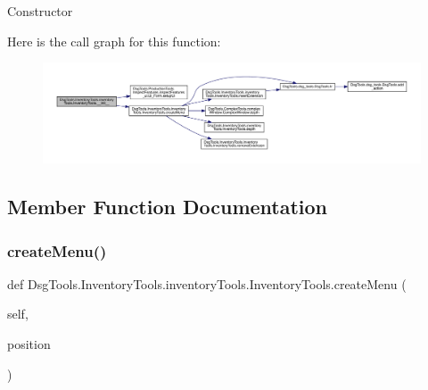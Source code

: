 \begin{DoxyVerb}Constructor
\end{DoxyVerb}
 Here is the call graph for this function\+:
\nopagebreak
\begin{figure}[H]
\begin{center}
\leavevmode
\includegraphics[width=350pt]{class_dsg_tools_1_1_inventory_tools_1_1inventory_tools_1_1_inventory_tools_ac27f158d879dd73dc7f4564d6e419e68_cgraph}
\end{center}
\end{figure}


\subsection{Member Function Documentation}
\mbox{\label{class_dsg_tools_1_1_inventory_tools_1_1inventory_tools_1_1_inventory_tools_ad2eacea7f239cce9518b8096a51cd9ed}} 
\subsubsection{\texorpdfstring{create\+Menu()}{createMenu()}}
{\footnotesize\ttfamily def Dsg\+Tools.\+Inventory\+Tools.\+inventory\+Tools.\+Inventory\+Tools.\+create\+Menu (\begin{DoxyParamCaption}\item[{}]{self,  }\item[{}]{position }\end{DoxyParamCaption})}


